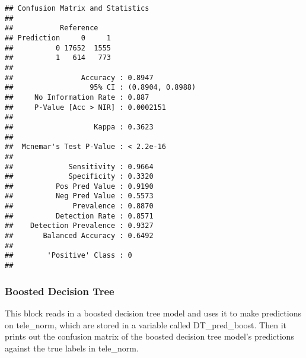 \documentclass[
]{article}
\newenvironment{Shaded}{\begin{snugshade}}{\end{snugshade}}
\newcommand{\DecValTok}[1]{\textcolor[rgb]{0.00,0.00,0.81}{#1}}
\newcommand{\FunctionTok}[1]{\textcolor[rgb]{0.00,0.00,0.00}{#1}}
\newcommand{\NormalTok}[1]{#1}
\newcommand{\OtherTok}[1]{\textcolor[rgb]{0.56,0.35,0.01}{#1}}
\newcommand{\SpecialCharTok}[1]{\textcolor[rgb]{0.00,0.00,0.00}{#1}}
\newcommand{\StringTok}[1]{\textcolor[rgb]{0.31,0.60,0.02}{#1}}
\begin{document}
\begin{Shaded}
\end{Shaded}

\begin{verbatim}
## Confusion Matrix and Statistics
## 
##           Reference
## Prediction     0     1
##          0 17652  1555
##          1   614   773
##                                           
##                Accuracy : 0.8947          
##                  95% CI : (0.8904, 0.8988)
##     No Information Rate : 0.887           
##     P-Value [Acc > NIR] : 0.0002151       
##                                           
##                   Kappa : 0.3623          
##                                           
##  Mcnemar's Test P-Value : < 2.2e-16       
##                                           
##             Sensitivity : 0.9664          
##             Specificity : 0.3320          
##          Pos Pred Value : 0.9190          
##          Neg Pred Value : 0.5573          
##              Prevalence : 0.8870          
##          Detection Rate : 0.8571          
##    Detection Prevalence : 0.9327          
##       Balanced Accuracy : 0.6492          
##                                           
##        'Positive' Class : 0               
## 
\end{verbatim}

\hypertarget{boosted-decision-tree}{%
\subsubsection{Boosted Decision Tree}\label{boosted-decision-tree}}

This block reads in a boosted decision tree model and uses it to make
predictions on tele\_norm, which are stored in a variable called
DT\_pred\_boost. Then it prints out the confusion matrix of the boosted
decision tree model's predictions against the true labels in tele\_norm.
\end{document}
